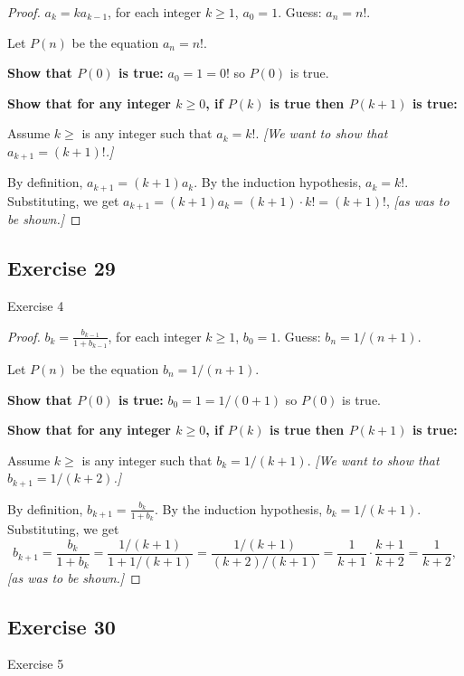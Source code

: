 \documentclass[14pt]{extarticle}
\newcommand{\dps}{\displaystyle}
\begin{document}
\begin{proof}
\(a_k = ka_{k-1}\), for each integer \(k \geq 1\), \(a_0 = 1\). Guess: \(a_n = n!\).

Let $P(n)$ be the equation \(a_n = n!\).

{\bf Show that \(P(0)\) is true:} \(a_0 = 1 = 0!\) so $P(0)$ is true.

{\bf Show that for any integer \(k \geq 0\), if \(P(k)\) is true then \(P(k+1)\) is true:}

Assume \(k \geq \) is any integer such that \(a_k = k!\). {\it [We want to show that \(a_{k+1} = (k+1)!\).]}

By definition, \(a_{k+1} = (k+1)a_k\). 
By the induction hypothesis, \(a_k = k!\). 
Substituting, we get \(a_{k+1} = (k+1)a_k = (k+1) \cdot k! = (k+1)!\), {\it [as was to be shown.]}
\end{proof}

\subsection{Exercise 29}
Exercise 4

\begin{proof}
\(b_k = \dps \frac{b_{k-1}}{1 + b_{k-1}}\), for each integer \(k \geq 1\), \(b_0 = 1\). Guess: \(b_n = 1/(n+1)\).

Let $P(n)$ be the equation \(b_n = 1/(n+1)\).

{\bf Show that \(P(0)\) is true:} \(b_0 = 1 = 1 / (0+1)\) so $P(0)$ is true.

{\bf Show that for any integer \(k \geq 0\), if \(P(k)\) is true then \(P(k+1)\) is true:}

Assume \(k \geq \) is any integer such that \(b_k = 1/(k+1)\). {\it [We want to show that \(b_{k+1} = 1/(k+2)\).]}

By definition, \(b_{k+1} = \dps \frac{b_k}{1 + b_k}\).
By the induction hypothesis, \(b_k = 1/(k+1)\).
Substituting, we get 
\[
b_{k+1} = \dps \frac{b_k}{1 + b_k} = \frac{1/(k+1)}{1 + 1/(k+1)} = \frac{1/(k+1)}{(k+2)/(k+1)} = \frac{1}{k+1} \cdot \frac{k+1}{k+2} = \frac{1}{k+2},
\] 
{\it [as was to be shown.]}
\end{proof}

\subsection{Exercise 30}
Exercise 5
\end{document}
